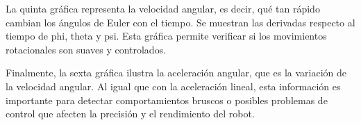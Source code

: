La quinta gráfica representa la velocidad angular, es decir, qué tan rápido cambian los ángulos de Euler con el tiempo. Se muestran las derivadas respecto al tiempo de phi, theta y psi. Esta gráfica permite verificar si los movimientos rotacionales son suaves y controlados.

Finalmente, la sexta gráfica ilustra la aceleración angular, que es la variación de la velocidad angular. Al igual que con la aceleración lineal, esta información es importante para detectar comportamientos bruscos o posibles problemas de control que afecten la precisión y el rendimiento del robot.
